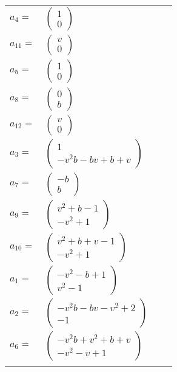 \documentclass[1p]{elsarticle_modified}
\theoremstyle{definition}
\begin{document}
\begin{tabular}{m{7pt} m{180pt} m{7pt} m{180pt} }
\flushright $a_{4}=$&$\begin{pmatrix}1\\0\end{pmatrix}$ \\
\flushright $a_{11}=$&$\begin{pmatrix}v\\0\end{pmatrix}$ \\
\flushright $a_{5}=$&$\begin{pmatrix}1\\0\end{pmatrix}$ \\
\flushright $a_{8}=$&$\begin{pmatrix}0\\b\end{pmatrix}$ \\
\flushright $a_{12}=$&$\begin{pmatrix}v\\0\end{pmatrix}$ \\
\flushright $a_{3}=$&$\begin{pmatrix}1\\- v^2 b- b v+b+v\end{pmatrix}$ \\
\flushright $a_{7}=$&$\begin{pmatrix}- b\\b\end{pmatrix}$ \\
\flushright $a_{9}=$&$\begin{pmatrix}v^2+b-1\\- v^2+1\end{pmatrix}$ \\
\flushright $a_{10}=$&$\begin{pmatrix}v^2+b+v-1\\- v^2+1\end{pmatrix}$ \\
\flushright $a_{1}=$&$\begin{pmatrix}- v^2- b+1\\v^2-1\end{pmatrix}$ \\
\flushright $a_{2}=$&$\begin{pmatrix}- v^2 b- b v- v^2+2\\-1\end{pmatrix}$ \\
\flushright $a_{6}=$&$\begin{pmatrix}- v^2 b+v^2+b+v\\- v^2- v+1\end{pmatrix}$\\&\end{tabular}
\end{document}
